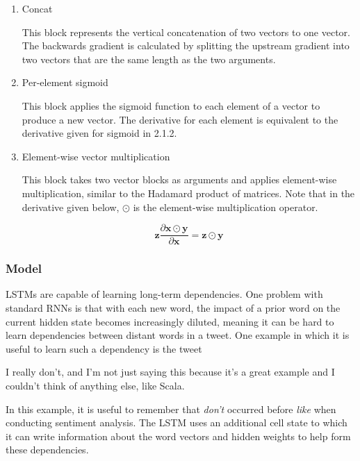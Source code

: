 \documentclass{article} %
\begin{document}
\begin{enumerate}

\item Concat

This block represents the vertical concatenation of two vectors to one vector. The backwards gradient is calculated by splitting the upstream gradient into two vectors that are the same length as the two arguments.

\item

Per-element sigmoid

This block applies the sigmoid function to each element of a vector to produce a new vector. The derivative for each element is equivalent to the derivative given for sigmoid in 2.1.2.

\item

Element-wise vector multiplication

This block takes two vector blocks as arguments and applies element-wise multiplication, similar to the Hadamard product of matrices. Note that in the derivative given below, $\odot$ is the element-wise multiplication operator.

\[
\mathbf{z} \frac{\partial \mathbf{x} \odot \mathbf{y}}{\partial \mathbf{x}} = \mathbf{z} \odot \mathbf{y}
\]

\end{enumerate}

\subsubsection{Model}

LSTMs are capable of learning long-term dependencies. One problem with standard RNNs is that with each new word, the impact of a prior word on the current hidden state becomes increasingly diluted, meaning it can be hard to learn dependencies between distant words in a tweet. One example in which it is useful to learn such a dependency is the tweet

\begin{displayquote}
I really don't, and I'm not just saying this because it's a great example and I couldn't think of anything else, like Scala.
\end{displayquote}

In this example, it is useful to remember that \emph{don't} occurred before \emph{like} when conducting sentiment analysis. The LSTM uses an additional cell state to which it can write information about the word vectors and hidden weights to help form these dependencies.
\end{document}
